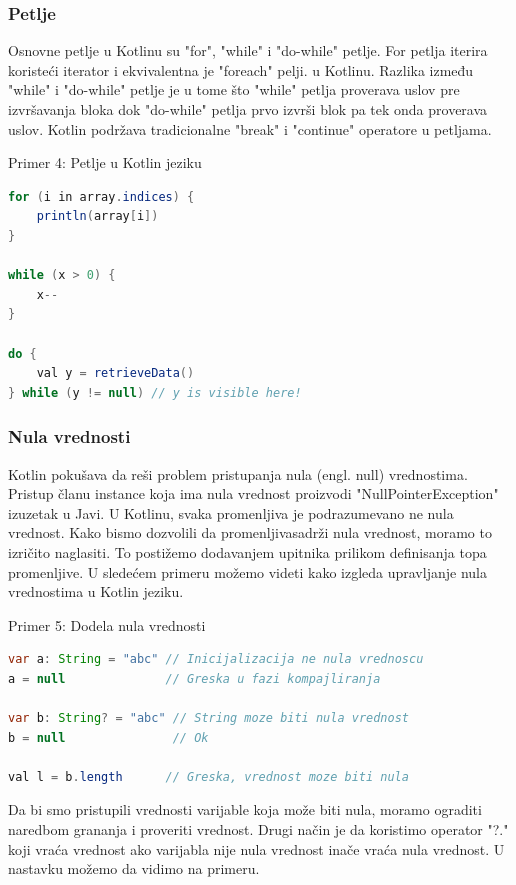 \documentclass[12pt,oneside]{memoir}
\begin{document}
 
\subsubsection{Petlje}
Osnovne petlje u Kotlinu su "for", "while" i "do-while" petlje. For petlja iterira koristeći iterator i ekvivalentna je "foreach" pelji.
u Kotlinu. Razlika između "while" i "do-while" petlje je u tome što "while" petlja proverava uslov pre izvršavanja bloka dok "do-while" petlja prvo izvrši blok pa tek onda proverava uslov. Kotlin podržava tradicionalne "break" i "continue" operatore u petljama.

\begin{center} Primer 4: Petlje u Kotlin jeziku\end{center}
\begin{lstlisting}[language=Java]
for (i in array.indices) {
    println(array[i])
}
 
while (x > 0) {
    x--
}
 
do {
    val y = retrieveData()
} while (y != null) // y is visible here!
\end{lstlisting}
 
\subsubsection{Nula vrednosti}
Kotlin pokušava da reši problem pristupanja nula (engl. null) vrednostima. Pristup članu instance koja ima nula vrednost proizvodi "NullPointerException" izuzetak u Javi. U Kotlinu, svaka promenljiva je podrazumevano ne nula vrednost. Kako bismo dozvolili da promenljivasadrži nula vrednost, moramo to izričito naglasiti. To postižemo dodavanjem upitnika prilikom definisanja topa promenljive. U sledećem primeru možemo videti kako izgleda upravljanje nula vrednostima u Kotlin jeziku.

\begin{center} Primer 5: Dodela nula vrednosti\end{center}
\begin{lstlisting}[language=Java]
var a: String = "abc" // Inicijalizacija ne nula vrednoscu
a = null              // Greska u fazi kompajliranja
 
var b: String? = "abc" // String moze biti nula vrednost
b = null               // Ok
 
val l = b.length      // Greska, vrednost moze biti nula
\end{lstlisting}
 
Da bi smo pristupili vrednosti varijable koja može biti nula, moramo ograditi naredbom grananja i proveriti vrednost. Drugi način je da koristimo operator "?." koji vraća vrednost ako varijabla nije nula vrednost inače vraća nula vrednost. U nastavku možemo da vidimo na primeru.
 
\end{document}
